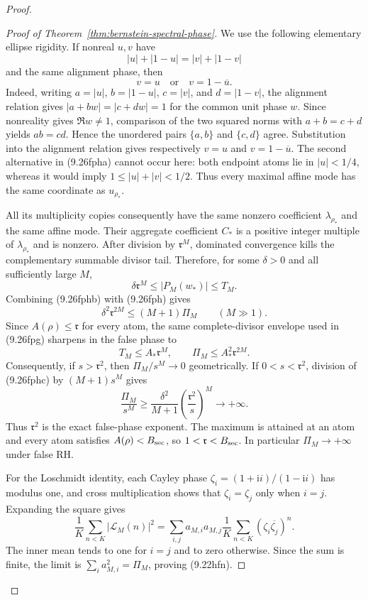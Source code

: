 \documentclass[11pt]{article}
\begin{document}
\begin{proof}
\begin{proof}[Proof of Theorem~\ref{thm:bernstein-spectral-phase}]
We use the following elementary ellipse rigidity.  If nonreal $u,v$ have
\[
 |u|+|1-u|=|v|+|1-v|
\]
and the same alignment phase, then
\[
 v=u\quad\text{or}\quad v=1-\overline u.
 \tag{9.26fpha}
\]
Indeed, writing $a=|u|$, $b=|1-u|$, $c=|v|$, and $d=|1-v|$, the alignment relation gives
$|a+bw|=|c+dw|=1$ for the common unit phase $w$.  Since nonreality gives
$\Re w\ne1$, comparison of the two squared norms with $a+b=c+d$ yields $ab=cd$.
Hence the unordered pairs $\{a,b\}$ and $\{c,d\}$ agree.
Substitution into the alignment relation gives respectively $v=u$ and
$v=1-\overline u$.  The second alternative in \textup{(9.26fpha)} cannot occur here: both
endpoint atoms lie in $|u|<1/4$, whereas it would imply
$1\le|u|+|v|<1/2$.  Thus every maximal affine mode has the same coordinate as $u_{\rho_*}$.

All its multiplicity copies consequently have the same nonzero coefficient $\lambda_{\rho_*}$
and the same affine mode.  Their aggregate coefficient $C_*$ is a positive integer multiple of
$\lambda_{\rho_*}$ and is nonzero.  After division by $\mathfrak r^M$, dominated convergence
kills the complementary summable divisor tail.  Therefore, for some $\delta>0$ and all
sufficiently large $M$,
\[
 \delta\mathfrak r^M\le |P_M(w_*)|\le T_M.
 \tag{9.26fphb}
\]
Combining \textup{(9.26fphb)} with \textup{(9.26fph)} gives
\[
 \delta^2\mathfrak r^{2M}\le(M+1)\Pi_M
 \qquad(M\gg1).
 \tag{9.26fphc}
\]
Since $A(\rho)\le\mathfrak r$ for every atom, the same complete-divisor envelope used in
\textup{(9.26fpg)} sharpens in the false phase to
\[
 T_M\le A_*\mathfrak r^M,
 \qquad
 \Pi_M\le A_*^2\mathfrak r^{2M}.
 \tag{9.26fphca}
\]
Consequently, if $s>\mathfrak r^2$, then $\Pi_M/s^M\to0$ geometrically.  If
$0<s<\mathfrak r^2$, division of \textup{(9.26fphc)} by $(M+1)s^M$ gives
\[
 \frac{\Pi_M}{s^M}\ge
 \frac{\delta^2}{M+1}\left(\frac{\mathfrak r^2}{s}\right)^M
 \longrightarrow+\infty.
 \tag{9.26fphcb}
\]
Thus $\mathfrak r^2$ is the exact false-phase exponent.  The maximum is attained at an atom and
every atom satisfies $A(\rho)<B_{\rm sec}$, so
$1<\mathfrak r<B_{\rm sec}$.  In particular $\Pi_M\to+\infty$ under false RH.

For the Loschmidt identity, each Cayley phase
$\zeta_i=(1+\mathrm i i)/(1-\mathrm i i)$ has modulus one, and cross multiplication shows that
$\zeta_i=\zeta_j$ only when $i=j$.  Expanding the square gives
\[
 \frac1K\sum_{n<K}|\mathcal L_M(n)|^2
 =\sum_{i,j}a_{M,i}a_{M,j}
   \frac1K\sum_{n<K}(\zeta_i\overline{\zeta_j})^n.
\]
The inner mean tends to one for $i=j$ and to zero otherwise.  Since the sum is finite, the limit
is $\sum_i a_{M,i}^2=\Pi_M$, proving \textup{(9.22hfn)}.


\end{proof}
\end{proof}
\end{document}
